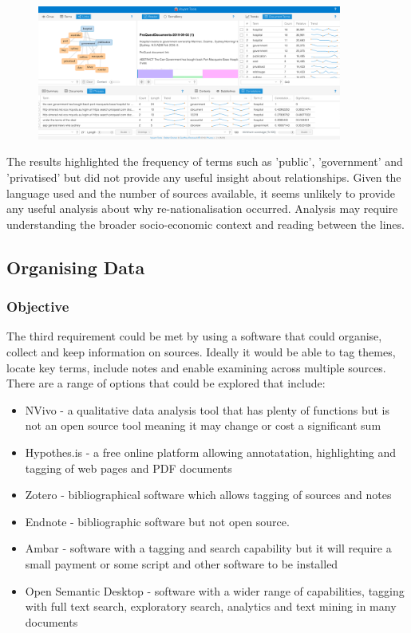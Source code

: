 \documentclass{article}
\begin{document}
\begin{figure}[htp]
    \centering
    \includegraphics[width=10cm]{Voyant.png}
    \label{fig:voyant}
\end{figure}

The results highlighted the frequency of terms such as 'public', 'government' and 'privatised' but did not provide any useful insight about relationships. Given the language used and the number of sources available, it seems unlikely to provide any useful analysis about why re-nationalisation occurred. Analysis may require understanding the broader socio-economic context and reading between the lines.

\subsection*{Organising Data}
\subsubsection*{Objective}

The third requirement could be met by using a software that could organise, collect and keep information on sources. Ideally it would be able to tag themes, locate key terms, include notes and enable examining across multiple sources. There are a range of options that could be explored that include:

\begin{itemize}
\item NVivo - a qualitative data analysis tool that has plenty of functions but is not an open source tool meaning it may change or cost a significant sum 
\item Hypothes.is - a free online platform allowing annotatation, highlighting and tagging of web pages and PDF documents
\item Zotero - bibliographical software which allows tagging of sources and notes
\item Endnote - bibliographic software but not open source.
\item Ambar - software with a tagging and search capability but it will require a small payment or some script and other software to be installed
\item Open Semantic Desktop - software with a wider range of capabilities, tagging with full text search, exploratory search, analytics and text mining in many documents
\end{itemize}
\end{document}
